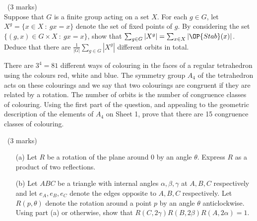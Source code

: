 \documentclass[12pt]{article}
\begin{document}
\newpage

\begin{question}\ (3 marks)\\
  Suppose that $G$ is a finite group acting on a set $X$. For each $g\in G$, let $X^g=\{x\in X\ :\ gx=x\}$ denote the set of fixed points of $g$. By considering the set $\{(g,x)\in G\times X\ :\ gx=x\}$, show that $\sum_{g\in G}|X^g|=\sum_{x\in X}|\OP{Stab}(x)|$. Deduce that there are $\frac{1}{|G|}\sum_{g\in G}|X^g|$ different orbits in total.

  There are $3^4=81$ different ways of colouring in the faces of a regular tetrahedron using the colours red, white and blue. The symmetry group $A_4$ of the tetrahedron acts on these colourings and we say that two colourings are congruent if they are related by a rotation. The number of orbits is the number of congruence classes of colouring. Using the first part of the question, and appealing to the geometric description of the elements of $A_4$ on Sheet 1, prove that there are 15 congruence classes of colouring.
\end{question}

\iffalse
\begin{answer}
  The set can be partitioned in two ways: $\bigcup_{g\in G}\{x\ :\ gx=x\}$ or $\bigcup_{x\in X}\{g\in G\ :\ gx=x\}$. Therefore it has size $\sum_{g\in G}|X^g|$ and $\sum_{x\in X}|\OP{Stab}(x)|$, proving the formula. Using the orbit-stabiliser theorem, we have that $\sum_{x\in X}|\OP{Stab}(x)|=\sum_{x\in X}|G|/|\OP{Orb}(x)|=|G|\sum_{x\in X}(1/|\OP{Orb}(x)|)=|G|\sum_{\mbox{orbits}}|\OP{Orb}(x)|/|\OP{Orb}(x)|=|G|\cdot N$ where $N$ is the number of orbits.

  To apply the formula we need to know the number of $g$-invariant colourings for each $g\in G$. For the (eight) rotations of order 3 it is easy to see that there are $3^2$ possible colourings (let $A$ be the axis of rotation; the face pierced by $A$ can be coloured in any way and the other three faces share a common colour). For the (three) rotations of order 2 it is easy to see that there are $3^2$ colourings. For the identity element, any colouring is invariant, so there are $3^4$. Therefore the formula gives
  \[\mbox{number of orbits }=\frac{1}{12}(3^4+3\times 3^2+8\times 3^2)=\frac{9}{12}(9+3+8)=15.\]
\end{answer}
\newpage
\fi

\vspace{1cm}

\begin{question}\ (3 marks)
  \begin{enumerate}
  \item[(a)] Let $R$ be a rotation of the plane around 0 by an angle $\theta$. Express $R$ as a product of two reflections.
  \item[(b)] Let $ABC$ be a triangle with internal angles $\alpha,\beta,\gamma$ at $A,B,C$ respectively and let $e_A,e_B,e_C$ denote the edges opposite to $A,B,C$ respectively. Let $R(p,\theta)$ denote the rotation around a point $p$ by an angle $\theta$ anticlockwise. Using part (a) or otherwise, show that $R(C,2\gamma)R(B,2\beta)R(A,2\alpha)=1$.
  \end{enumerate}
\end{question}
\end{document}
